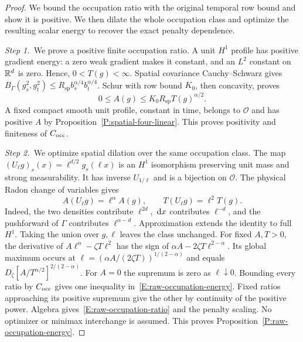 \begin{proof}
  We bound the occupation ratio with the original temporal row bound and show
  it is positive. We then dilate the whole occupation class and optimize the
  resulting scalar energy to recover the exact penalty dependence.


  \medskip
  \noindent\textit{Step 1.~}We prove a positive finite occupation ratio.
  A unit $H^1$ profile has positive gradient energy: a zero weak gradient makes
  it constant, and an $L^2$ constant on $\mathbb{R}^d$ is zero. Hence, $0 < T(g) <
  \infty$. Spatial covariance Cauchy--Schwarz gives $B_\Gamma(g_s^2,g_t^2) \le
  R_{\mathrm{sp}}b_s^{\alpha/4}b_t^{\alpha/4}$. Schur with row bound $K_0$, then
  concavity, proves
  \begin{equation}\label{E:raw-occupation-bound}
    0\le A(g)\le K_0R_{\mathrm{sp}}T(g)^{\alpha/2}.
  \end{equation}
  A fixed compact smooth unit profile, constant in time, belongs to
  $\mathcal{O}$ and has positive $A$ by Proposition~\ref{P:spatial-four-linear}.
  This proves positivity and finiteness of $C_{\rm occ}$.


  \medskip
  \noindent\textit{Step 2.~}We optimize spatial dilation over the same
  occupation class.
  The map $(U_\ell g)_s(x) = \ell^{d/2}g_s(\ell x)$ is an $H^1$ isomorphism
  preserving unit mass and strong measurability. It has inverse $U_{1/\ell}$ and
  is a bijection on $\mathcal{O}$. The physical Radon change of variables gives
  \[
    A(U_\ell g)=\ell^\alpha A(g),\qquad
    T(U_\ell g)=\ell^2T(g).
  \]
  Indeed, the two densities contribute $\ell^{2d}$, $\,\mathrm{d} x$ contributes
  $\ell^{-d}$, and the pushforward of $\Gamma$ contributes $\ell^{\alpha-d}$.
  Approximation extends the identity to full $H^1$. Taking the union over
  $g,\ell$ leaves the class unchanged. For fixed $A,T > 0$, the derivative of
  $A\ell^\alpha-\zeta T\ell^2$ has the sign of $\alpha A-2\zeta
  T\ell^{2-\alpha}$. Its global maximum occurs at $\ell = (\alpha A/(2\zeta
  T))^{1/(2-\alpha)}$ and equals $D_\zeta[A/T^{\alpha/2}]^{2/(2-\alpha)}$. For
  $A = 0$ the supremum is zero as $\ell\downarrow0$. Bounding every ratio by
  $C_{\rm occ}$ gives one inequality in~\eqref{E:raw-occupation-energy}. Fixed
  ratios approaching its positive supremum give the other by continuity of the
  positive power. Algebra gives~\eqref{E:raw-occupation-ratio} and the penalty
  scaling. No optimizer or minimax interchange is assumed. This proves
  Proposition~\ref{P:raw-occupation-energy}.
\end{proof}

